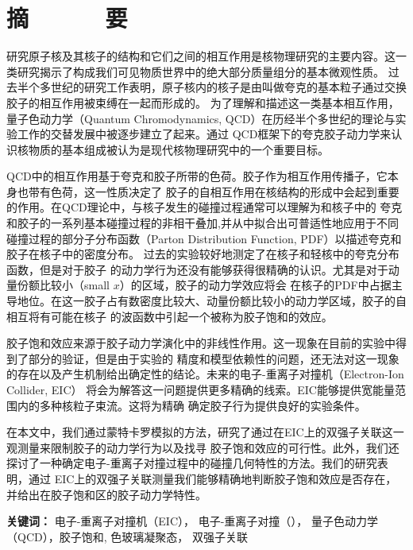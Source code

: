 
\chapter*{\LARGE  \bfseries {摘\ \ \ \ \ \ 要} }


\qquad 研究原子核及其核子的结构和它们之间的相互作用是核物理研究的主要内容。这一类研究揭示了构成我们可见物质世界中的绝大部分质量组分的基本微观性质。
过去半个多世纪的研究工作表明，原子核内的核子是由叫做夸克的基本粒子通过交换胶子的相互作用被束缚在一起而形成的。
为了理解和描述这一类基本相互作用，量子色动力学（Quantum Chromodynamics,
QCD）在历经半个多世纪的理论与实验工作的交替发展中被逐步建立了起来。通过
QCD框架下的夸克胶子动力学来认识核物质的基本组成被认为是现代核物理研究中的一个重要目标。

QCD中的相互作用基于夸克和胶子所带的色荷。胶子作为相互作用传播子，它本身也带有色荷，这一性质决定了
胶子的自相互作用在核结构的形成中会起到重要的作用。在QCD理论中，与核子发生的碰撞过程通常可以理解为和核子中的
夸克和胶子的一系列基本碰撞过程的非相干叠加,并从中拟合出可普适性地应用于不同碰撞过程的部分子分布函数（Parton Distribution Function,
PDF）以描述夸克和胶子在核子中的密度分布。 过去的实验较好地测定了在核子和轻核中的夸克分布函数，但是对于胶子
的动力学行为还没有能够获得很精确的认识。尤其是对于动量份额比较小（small $x$）的区域，胶子的动力学效应将会
在核子的PDF中占据主导地位。在这一胶子占有数密度比较大、动量份额比较小的动力学区域，胶子的自相互将有可能在核子 的波函数中引起一个被称为胶子饱和的效应。

胶子饱和效应来源于胶子动力学演化中的非线性作用。这一现象在目前的实验中得到了部分的验证，但是由于实验的
精度和模型依赖性的问题，还无法对这一现象的存在以及产生机制给出确定性的结论。未来的电子-重离子对撞机（Electron-Ion Collider, EIC）
将会为解答这一问题提供更多精确的线索。EIC能够提供宽能量范围内的多种核粒子束流。这将为精确 确定胶子行为提供良好的实验条件。

在本文中，我们通过蒙特卡罗模拟的方法，研究了通过在EIC上的双强子关联这一观测量来限制胶子的动力学行为以及找寻
胶子饱和效应的可行性。此外，我们还探讨了一种确定电子-重离子对撞过程中的碰撞几何特性的方法。我们的研究表明，通过
EIC上的双强子关联测量我们能够精确地判断胶子饱和效应是否存在，并给出在胶子饱和区的胶子动力学特性。

\vspace{4mm}

\noindent
\textbf{关键词：} 电子-重离子对撞机（EIC）， 电子-重离子对撞（\eA ）， 量子色动力学 （QCD），胶子饱和, 色玻璃凝聚态， 双强子关联

